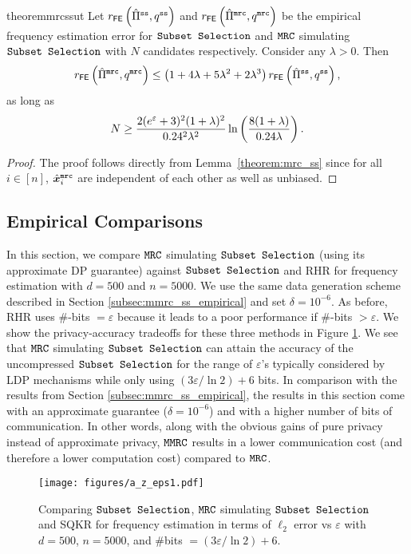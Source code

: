 \begin{restatable}{theorem}{mrcssut}
Let $r_{\mathsf{FE}} \left( \hat{\Pi}^\texttt{ss}, q^{\texttt{ss}} \right)$ and $r_{\mathsf{FE}} \left( \hat{\Pi}^\texttt{mrc}, q^{\texttt{mrc}} \right)$ be the empirical frequency estimation error for \emph{$\texttt{Subset Selection}$} and \emph{$\texttt{MRC}$} simulating \emph{$\texttt{Subset Selection}$} with $N$ candidates respectively. Consider any $\lambda > 0$. Then
 \begin{equation}
     r_{\mathsf{FE}} \left( \hat{\Pi}^{ \texttt{mrc}}, q^{\texttt{mrc}} \right) \leq  
     \left( 1+4\lambda+5\lambda^2+2\lambda^3 \right) r_{\mathsf{FE}} \left( \hat{\Pi}^{ \texttt{ss}}, q^{\texttt{ss}} \right),
 \end{equation}
as long as 
\begin{align}
   N \geq  \frac{2(e^{\varepsilon}+3)^2(1+\lambda)^2}{0.24^2\lambda^2}\ln\left( \frac{8(1+\lambda)}{0.24\lambda}\right).
\end{align}
\end{restatable}
\begin{proof}
The proof follows directly from Lemma~\ref{theorem:mrc_ss} since for all $i \in [n]$, $\hat{{\boldsymbol{x}}}^{\texttt{mrc}}_i$ are independent of each other as well as unbiased.
\end{proof}


\subsection{Empirical Comparisons}
\label{appendix:mrc_ss_emp}
In this section, we compare $\texttt{MRC}$ simulating $\texttt{Subset Selection}$ (using its approximate DP guarantee) against $\texttt{Subset Selection}$ and RHR for frequency estimation with $d = 500$ and $n = 5000$. We use the same data generation scheme described in Section \ref{subsec:mmrc_ss_empirical} and set $\delta = 10^{-6}$. As before, RHR uses $\#$-bits $= \varepsilon$ because it leads to a poor performance if $\#$-bits $ > \varepsilon$. We show the privacy-accuracy tradeoffs for these three methods in Figure \ref{fig:a_freq}. We see that $\texttt{MRC}$ simulating $\texttt{Subset Selection}$ can attain the accuracy of the uncompressed $\texttt{Subset Selection}$ for the range of  $\varepsilon$'s typically considered by LDP mechanisms while only using $(3\varepsilon/ \ln 2) + 6$ bits. In comparison with the results from Section \ref{subsec:mmrc_ss_empirical}, the results in this section come with an approximate guarantee ($\delta = 10^{-6}$) and with a higher number of bits of communication. In other words, along with the obvious gains of pure privacy instead of approximate privacy, $\texttt{MMRC}$ results in a lower communication cost (and therefore a lower computation cost) compared to $\texttt{MRC}$.

\begin{figure}[h]
\centering
\texttt{[image: figures/a\_z\_eps1.pdf]}
\caption{Comparing $\texttt{Subset Selection}$, $\texttt{MRC}$ simulating $\texttt{Subset Selection}$ and SQKR for frequency estimation in terms of $\ell_2$ error vs $\varepsilon$ with $d = 500$, $n = 5000$, and $\#$bits $= (3\varepsilon/ \ln 2) + 6$.}
\label{fig:a_freq}
\end{figure}